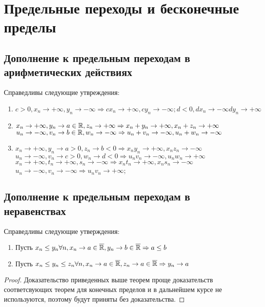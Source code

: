 \documentclass[main]{subfiles}
\begin{document}
\section{Предельные переходы и бесконечные пределы}
\subsection{Дополнение к предельным переходам в арифметических действиях}
\begin{theorem}
    Справедливы следующие утвреждения:
    \begin{enumerate}
        \item $c > 0, x_n \to +\infty, y_n \to -\infty \Rightarrow
    cx_n \to +\infty, cy_n \to -\infty; d < 0, dx_n \to -\infty 
    dy_n \to +\infty$
        \item $x_n \to +\infty, y_n \to a \in \mathbb{R}, z_n \to +\infty \Rightarrow
    x_n + y_n \to +\infty, x_n + z_n \to +\infty$ 
    $u_n \to -\infty, v_n \to b \in \mathbb{R}, w_n \to -\infty \Rightarrow
    u_n + v_n \to -\infty, u_n + w_n \to -\infty$ 
        \item $x_n \to +\infty, y_n \to a > 0, z_n \to b < 0 \Rightarrow 
    x_ny_n \to +\infty, x_nz_n \to -\infty$
    $u_n \to -\infty, v_n \to c > 0, w_n \to d < 0 \Rightarrow 
    u_nv_n \to -\infty, u_nw_n \to +\infty$
    $x_n \to +\infty, t_n \to +\infty, s_n \to -\infty \Rightarrow
    x_nt_n \to +\infty, x_ns_n \to -\infty$
    $u_n \to -\infty, v_n \to -\infty \Rightarrow u_nv_n \to +\infty$;
    \end{enumerate}
\end{theorem}

\subsection{Дополнение к предельным переходам в неравенствах}
\begin{theorem}
    Справедливы следующие утверждения:
    \begin{enumerate}
        \item Пусть $x_n \leq y_n \forall n, x_n \to a \in \overline{\mathbb{R}},
        y_n \to b \in \overline{\mathbb{R}} \Rightarrow a \leq b$
        \item Пусть $x_n \leq y_n \leq z_n \forall n, x_n \to a \in \overline{\mathbb{R}},
        z_n \to a \in \overline{\mathbb{R}} \Rightarrow y_n \to a$ 
    \end{enumerate}
\end{theorem}
\begin{proof}
    Доказательство приведенных выше теорем проще доказательств соответсвующих
    теорем для конечных пределов и в дальнейшем курсе не используются, 
    поэтому будут приняты без доказательства.
\end{proof}
\end{document}

